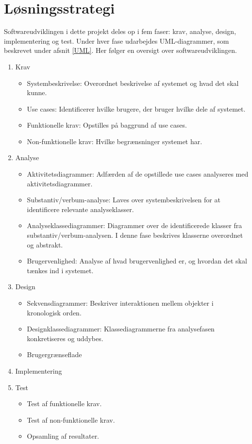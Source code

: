 
\section{Løsningsstrategi}
Softwareudviklingen i dette projekt deles op i fem faser: krav, analyse, design, implementering og test. Under hver fase udarbejdes UML-diagrammer, som beskrevet under afsnit \ref{UML}. Her følger en oversigt over softwareudviklingen.

\begin{enumerate}
    \item Krav
        \begin{itemize}
            \item Systembeskrivelse: Overordnet beskrivelse af systemet og hvad det skal kunne.
            \item Use cases: Identificerer hvilke brugere, der bruger hvilke dele af systemet.
            \item Funktionelle krav: Opstilles på baggrund af use cases.
            \item Non-funktionelle krav: Hvilke begrænsninger systemet har.
        \end{itemize}
    \item Analyse
        \begin{itemize}
            \item Aktivitetsdiagrammer: Adfærden af de opstillede use cases analyseres med aktivitetsdiagrammer.
            \item Substantiv/verbum-analyse: Laves over systembeskrivelsen for at identificere relevante analyseklasser.
            \item Analyseklassediagrammer: Diagrammer over de identificerede klasser fra substantiv/verbum-analysen. I denne fase beskrives klasserne overordnet og abstrakt.
            \item Brugervenlighed: Analyse af hvad brugervenlighed er, og hvordan det skal tænkes ind i systemet.
        \end{itemize}
    \item Design
        \begin{itemize}
            \item Sekvensdiagrammer: Beskriver interaktionen mellem objekter i kronologisk orden.
            \item Designklassediagrammer: Klassediagrammerne fra analysefasen konkretiseres og uddybes.
            \item Brugergrænseflade
        \end{itemize}
    \item Implementering
    \item Test
        \begin{itemize}
            \item Test af funktionelle krav.
            \item Test af non-funktionelle krav.
            \item Opsamling af resultater.
        \end{itemize}
\end{enumerate}
